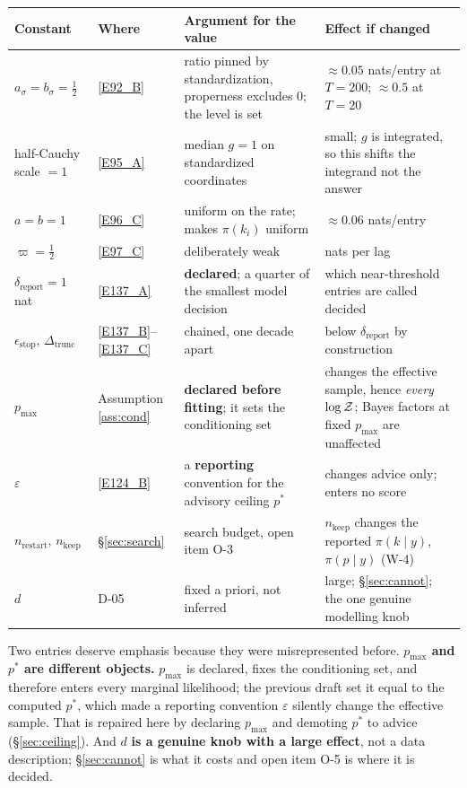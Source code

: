 \begin{center}
\small
\begin{tabular}{@{}>{\raggedright\arraybackslash}p{3.5cm}
                  >{\raggedright\arraybackslash}p{2.4cm}
                  >{\raggedright\arraybackslash}p{5.2cm}
                  >{\raggedright\arraybackslash}p{4.9cm}@{}}
\toprule
Constant & Where & Argument for the value & Effect if changed \\
\midrule
$a_\sigma=b_\sigma=\frac12$ & \eqref{E92_B} &
  ratio pinned by standardization, properness excludes 0; the level is set &
  $\approx0.05$ nats/entry at $T=200$; $\approx0.5$ at $T=20$ \\
half-Cauchy scale $=1$ & \eqref{E95_A} &
  median $g=1$ on standardized coordinates &
  small; $g$ is integrated, so this shifts the integrand not the answer \\
$a=b=1$ & \eqref{E96_C} &
  uniform on the rate; makes $\pi(k_i)$ uniform &
  $\approx0.06$ nats/entry \\
$\varpi=\frac12$ & \eqref{E97_C} & deliberately weak & 0.69 nats per lag \\
$\delta_{\text{report}}=1$ nat & \eqref{E137_A} &
  \textbf{declared}; a quarter of the smallest model decision &
  which near-threshold entries are called decided \\
$\epsilon_{\text{stop}}$, $\Delta_{\text{trunc}}$ & \eqref{E137_B}--\eqref{E137_C} &
  chained, one decade apart &
  below $\delta_{\text{report}}$ by construction \\
$p_{\max}$ & Assumption \ref{ass:cond} &
  \textbf{declared before fitting}; it sets the conditioning set &
  changes the effective sample, hence \emph{every} $\log\mathcal{Z}$; Bayes factors at fixed
  $p_{\max}$ are unaffected \\
$\varepsilon$ & \eqref{E124_B} &
  a \textbf{reporting} convention for the advisory ceiling $p^*$ &
  changes advice only; enters no score \\
$n_{\text{restart}}$, $n_{\text{keep}}$ & \S\ref{sec:search} &
  search budget, open item O-3 &
  $n_{\text{keep}}$ changes the reported $\pi(k\mid y)$, $\pi(p\mid y)$ (W-4) \\
$d$ & D-05 & fixed a priori, not inferred &
  large; \S\ref{sec:cannot}; the one genuine modelling knob \\
\bottomrule
\end{tabular}
\end{center}

Two entries deserve emphasis because they were misrepresented before.
\textbf{$p_{\max}$ and $p^*$ are different objects.} $p_{\max}$ is declared, fixes
the conditioning set, and therefore enters every marginal likelihood; the previous
draft set it equal to the computed $p^*$, which made a reporting convention
$\varepsilon$ silently change the effective sample. That is repaired here by
declaring $p_{\max}$ and demoting $p^*$ to advice (\S\ref{sec:ceiling}). And $d$
\textbf{is a genuine knob with a large effect}, not a data description;
\S\ref{sec:cannot} is what it costs and open item O-5 is where it is decided.

